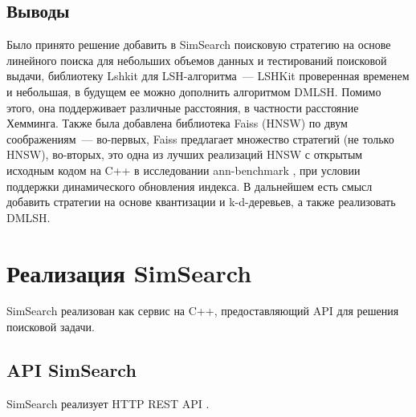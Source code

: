 \documentclass[a4paper,12pt]{extarticle}
\begin{document}
\subsection{Выводы}

Было принято решение добавить в SimSearch поисковую стратегию на основе линейного поиска для небольших объемов данных и тестирований поисковой выдачи, библиотеку Lshkit для LSH-алгоритма~--- LSHKit проверенная временем и небольшая, в будущем ее можно дополнить алгоритмом DMLSH. Помимо этого, она поддерживает различные расстояния, в частности расстояние Хемминга. Также была добавлена библиотека Faiss (HNSW) по двум соображениям~--- во-первых, Faiss предлагает множество стратегий (не только HNSW), во-вторых, это одна из лучших реализаций HNSW с открытым исходным кодом на C++ в исследовании ann-benchmark \cite{annbenchmark}, при условии поддержки динамического обновления индекса. В дальнейшем есть смысл добавить стратегии на основе квантизации и k-d-деревьев, а также реализовать DMLSH.

\newpage

\section {Реализация SimSearch}

SimSearch реализован как сервис на C++, предоставляющий API для решения поисковой задачи.

\subsection{API SimSearch}

SimSearch реализует HTTP REST API \cite{api}.
\end{document}
